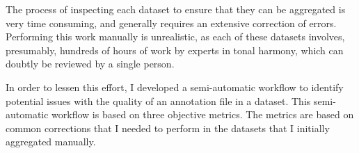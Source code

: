 
The process of inspecting each dataset to ensure that they
can be aggregated is very time consuming, and generally
requires an extensive correction of errors. Performing this
work manually is unrealistic, as each of these datasets
involves, presumably, hundreds of hours of work by experts
in tonal harmony, which can doubtly be reviewed by a single
person.

In order to lessen this effort, I developed a semi-automatic
workflow to identify potential issues with the quality of an
annotation file in a dataset. This semi-automatic workflow
is based on three objective metrics. The metrics are based
on common corrections that I needed to perform in the
datasets that I initially aggregated manually.
